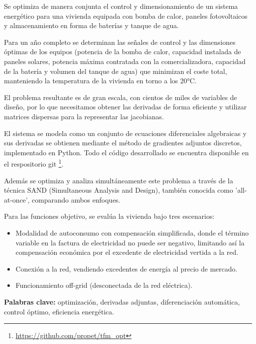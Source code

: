 Se optimiza de manera conjunta el control y dimensionamiento de un sistema
energético para una vivienda equipada con bomba de calor, paneles fotovoltaicos
y almacenamiento en forma de baterías y tanque de agua.

Para un año completo se determinan las señales de control y las dimensiones
óptimas de los equipos (potencia de la bomba de calor, capacidad instalada de
paneles solares, potencia máxima contratada con la comercializadora, capacidad
de la batería y volumen del tanque de agua) que minimizan el coste total,
manteniendo la temperatura de la vivienda en torno a los 20°C.

El problema resultante es de gran escala, con cientos de miles de variables de
diseño, por lo que necesitamos obtener las derivadas de forma eficiente y
utilizar matrices dispersas para la representar las jacobianas.

El sistema se modela como un conjunto de ecuaciones diferenciales algebraicas y
sus derivadas se obtienen mediante el método de gradientes adjuntos discretos,
implementado en Python. Todo el código desarrollado se encuentra disponible en
el respositorio git \footnote{\url{https://github.com/propet/tfm_opt}}.

Además se optimiza y analiza simultáneamente este problema a través de la
técnica SAND (Simultaneous Analysis and Design), también conocida como
'all-at-once', comparando ambos enfoques.

Para las funciones objetivo, se evalúa la vivienda bajo tres escenarios:

\begin{itemize}
	\item Modalidad de autoconsumo con compensación simplificada, donde el término
	      variable en la factura de electricidad no puede ser negativo, limitando así la
	      compensación económica por el excedente de electricidad vertida a la red.
	\item Conexión a la red, vendiendo excedentes de energía al precio de mercado.
	\item Funcionamiento off-grid (desconectada de la red eléctrica).
\end{itemize}



\begin{flushleft}
	\textbf{Palabras clave:} optimización, derivadas adjuntas, diferenciación
	automática, control óptimo, eficiencia energética.
\end{flushleft}
